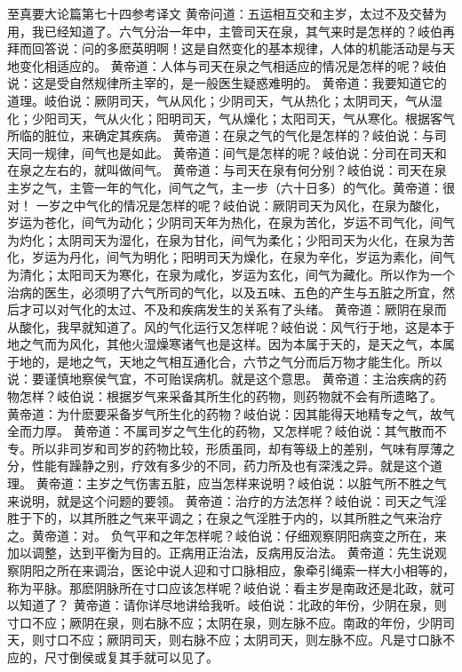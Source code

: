 \documentclass[a4paper,12pt,UTF8,twoside]{ctexbook}
\begin{document}
至真要大论篇第七十四参考译文
黄帝问道：五运相互交和主岁，太过不及交替为用，我已经知道了。六气分治一年中，主管司天在泉，其气来时是怎样的？岐伯再拜而回答说：问的多麽英明啊！这是自然变化的基本规律，人体的机能活动是与天地变化相适应的。
黄帝道：人体与司天在泉之气相适应的情况是怎样的呢？岐伯说：这是受自然规律所主宰的，是一般医生疑惑难明的。
黄帝道：我要知道它的道理。岐伯说：厥阴司天，气从风化；少阴司天，气从热化；太阴司天，气从湿化；少阳司天，气从火化；阳明司天，气从燥化；太阳司天，气从寒化。根据客气所临的脏位，来确定其疾病。
黄帝道：在泉之气的气化是怎样的？岐伯说：与司天同一规律，间气也是如此。
黄帝道：间气是怎样的呢？岐伯说：分司在司天和在泉之左右的，就叫做间气。
黄帝道：与司天在泉有何分别？岐伯说：司天在泉主岁之气，主管一年的气化，间气之气，主一步（六十日多）的气化。黄帝道：很对！
一岁之中气化的情况是怎样的呢？岐伯说：厥阴司天为风化，在泉为酸化，岁运为苍化，间气为动化；少阴司天年为热化，在泉为苦化，岁运不司气化，间气为灼化；太阴司天为湿化，在泉为甘化，间气为柔化；少阳司天为火化，在泉为苦化，岁运为丹化，间气为明化；阳明司天为燥化，在泉为辛化，岁运为素化，间气为清化；太阳司天为寒化，在泉为咸化，岁运为玄化，间气为藏化。所以作为一个治病的医生，必须明了六气所司的气化，以及五味、五色的产生与五脏之所宜，然后才可以对气化的太过、不及和疾病发生的关系有了头绪。
黄帝道：厥阴在泉而从酸化，我早就知道了。风的气化运行又怎样呢？岐伯说：风气行于地，这是本于地之气而为风化，其他火湿燥寒诸气也是这样。因为本属于天的，是天之气，本属于地的，是地之气，天地之气相互通化合，六节之气分而后万物才能生化。所以说：要谨慎地察侯气宜，不可贻误病机。就是这个意思。
黄帝道：主治疾病的药物怎样？岐伯说：根据岁气来采备其所生化的药物，则药物就不会有所遗略了。
黄帝道：为什麽要采备岁气所生化的药物？岐伯说：因其能得天地精专之气，故气全而力厚。
黄帝道：不属司岁之气生化的药物，又怎样呢？岐伯说：其气散而不专。所以非司岁和司岁的药物比较，形质虽同，却有等级上的差别，气味有厚薄之分，性能有躁静之别，疗效有多少的不同，药力所及也有深浅之异。就是这个道理。
黄帝道：主岁之气伤害五脏，应当怎样来说明？岐伯说：以脏气所不胜之气来说明，就是这个问题的要领。
黄帝道：治疗的方法怎样？岐伯说：司天之气淫胜于下的，以其所胜之气来平调之；在泉之气淫胜于内的，以其所胜之气来治疗之。黄帝道：对。
负气平和之年怎样呢？岐伯说：仔细观察阴阳病变之所在，来加以调整，达到平衡为目的。正病用正治法，反病用反治法。
黄帝道：先生说观察阴阳之所在来调治，医论中说人迎和寸口脉相应，象牵引绳索一样大小相等的，称为平脉。那麽阴脉所在寸口应该怎样呢？岐伯说：看主岁是南政还是北政，就可以知道了？
黄帝道：请你详尽地讲给我听。岐伯说：北政的年份，少阴在泉，则寸口不应；厥阴在泉，则右脉不应；太阴在泉，则左脉不应。南政的年份，少阴司天，则寸口不应；厥阴司天，则右脉不应；太阴司天，则左脉不应。凡是寸口脉不应的，尺寸倒侯或复其手就可以见了。
\end{document}
